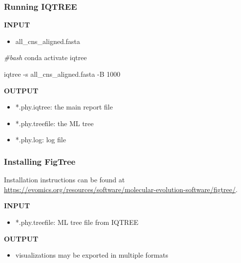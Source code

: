 \documentclass[
  12pt,
]{article}
\newenvironment{Shaded}{\begin{snugshade}}{\end{snugshade}}
\newcommand{\AttributeTok}[1]{\textcolor[rgb]{0.13,0.29,0.53}{#1}}
\newcommand{\CommentTok}[1]{\textcolor[rgb]{0.56,0.35,0.01}{\textit{#1}}}
\newcommand{\ExtensionTok}[1]{#1}
\newcommand{\NormalTok}[1]{#1}
\providecommand{\tightlist}{%
  \setlength{\itemsep}{0pt}\setlength{\parskip}{0pt}}
\begin{document}
\hypertarget{running-iqtree}{%
\subsubsection{Running IQTREE}\label{running-iqtree}}

\textbf{INPUT}

\begin{itemize}
\tightlist
\item
  all\_cns\_aligned.fasta
\end{itemize}

\begin{Shaded}
\begin{Highlighting}[]
\CommentTok{\#bash}
\ExtensionTok{conda}\NormalTok{ activate iqtree}

\ExtensionTok{iqtree} \AttributeTok{{-}s}\NormalTok{ all\_cns\_aligned.fasta }\AttributeTok{{-}B}\NormalTok{ 1000}
\end{Highlighting}
\end{Shaded}

\textbf{OUTPUT}

\begin{itemize}
\tightlist
\item
  *.phy.iqtree: the main report file
\item
  *.phy.treefile: the ML tree
\item
  *.phy.log: log file
\end{itemize}

\hypertarget{installing-figtree-2}{%
\subsubsection{Installing FigTree}\label{installing-figtree-2}}

Installation instructions can be found at \url{https://evomics.org/resources/software/molecular-evolution-software/figtree/}.

\textbf{INPUT}

\begin{itemize}
\tightlist
\item
  *.phy.treefile: ML tree file from IQTREE
\end{itemize}

\textbf{OUTPUT}

\begin{itemize}
\tightlist
\item
  visualizations may be exported in multiple formats
\end{itemize}
\end{document}
